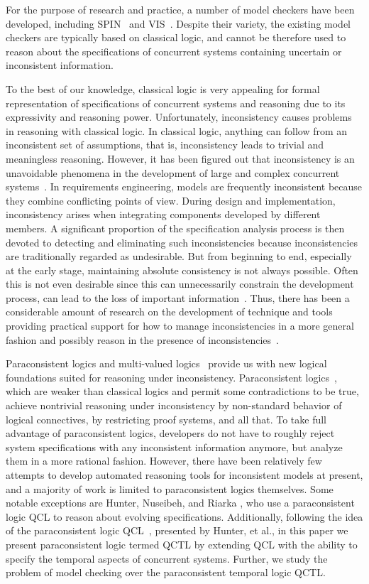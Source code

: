 \documentclass{entcs}
\begin{document}
For the purpose of research and practice, a number of model checkers
have been developed, including SPIN~\cite{spin} and VIS~\cite{VIS}.
Despite their variety, the existing model checkers are typically
based on classical logic, and cannot be therefore used to reason
about the specifications of concurrent systems containing uncertain
or inconsistent information.

To the best of our knowledge, classical logic is very appealing for
formal representation of specifications of concurrent systems and
reasoning due to its expressivity and reasoning power.
Unfortunately, inconsistency causes problems in reasoning with
classical logic. In classical logic, anything can follow from an
inconsistent set of assumptions, that is, inconsistency leads to
trivial and meaningless reasoning. However, it has been figured out
that inconsistency is an unavoidable phenomena in the development of
large and complex concurrent systems~\cite{Incon}. In requirements
engineering, models are frequently inconsistent because they combine
conflicting points of view. During design and implementation,
inconsistency arises when integrating components developed by
different members. A significant proportion of the specification
analysis process is then devoted to detecting and eliminating such
inconsistencies because inconsistencies are traditionally regarded
as undesirable. But from beginning to end, especially at the early
stage, maintaining absolute consistency is not always possible.
Often this is not even desirable since this can unnecessarily
constrain the development process, can lead to the loss of important
information~\cite{Incon1}. Thus, there has been a considerable
amount of research on the development of technique and tools
providing practical support for how to manage inconsistencies in a
more general fashion and possibly reason in the presence of
inconsistencies~\cite{Handle1,Hunter1,Formal}.

Paraconsistent logics and multi-valued
logics~\cite{MVProver1,P.Godefroid}
 provide us with new logical foundations
suited for reasoning under inconsistency.
 Paraconsistent logics~\cite{Para1,Para2}, which are weaker than classical logics
and permit some contradictions to be true, achieve nontrivial
reasoning under inconsistency by non-standard behavior of logical
connectives, by restricting proof systems, and all that. To take
full advantage of paraconsistent logics, developers do not have to
roughly reject system specifications with any inconsistent
information anymore, but analyze them in a more rational fashion.
However, there have been relatively few attempts to develop
automated reasoning tools for inconsistent models at present, and a
majority of work is limited to paraconsistent logics themselves.
Some notable exceptions are Hunter, Nuseibeh, and Riarka
\cite{Hunter1,QZ}, who use a paraconsistent logic QCL to reason
about evolving specifications. Additionally, following the idea of
the paraconsistent logic QCL~\cite{Hunter1}, presented by Hunter, et
al., in this paper we present paraconsistent logic termed QCTL by
extending QCL with the ability to specify the temporal aspects of
concurrent systems. Further, we study the problem of model checking
over the paraconsistent temporal logic QCTL.
\end{document}
